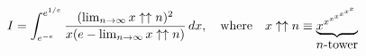 $$
  I=\int^{e^{1/e}}_{e^{-e}}
      {{(\lim_{n\to\infty}x\uparrow\uparrow n)^2}
            \over{x(e-\lim_{n\to\infty}x\uparrow\uparrow n)}}\,dx,
  \quad\hbox{where}\quad
  x\uparrow\uparrow n\equiv \underbrace{x^{x^{x^{x^{x^{x^{x}}}}}}}_{\hbox{$n$-tower}}
  $$
\bye

